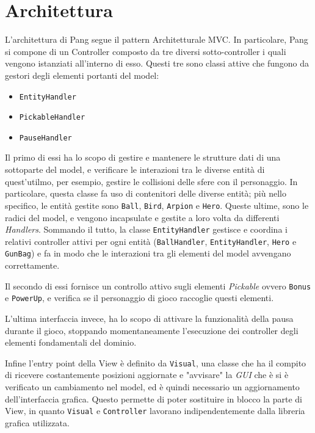 \documentclass[a4paper,12pt]{report}
\begin{document}
\section{Architettura}
L'architettura di Pang segue il pattern Architetturale MVC. In particolare, Pang si compone di un Controller composto da tre diversi sotto-controller i quali vengono istanziati all'interno di esso. Questi tre sono classi attive che fungono da gestori degli elementi portanti del model: 
\begin{itemize}
    \item \texttt{EntityHandler}
    \item \texttt{PickableHandler}
    \item \texttt{PauseHandler}
\end{itemize}
Il primo di essi ha lo scopo di gestire e mantenere le strutture dati di una sottoparte del model, e verificare le interazioni tra le diverse entità di quest'utilmo, per esempio, gestire le collisioni delle sfere con il personaggio. In particolare, questa classe fa uso di contenitori delle diverse entità; più nello specifico, le entità gestite sono \texttt{Ball}, \texttt{Bird}, \texttt{Arpion} e \texttt{Hero}. Queste ultime, sono le radici del model, e vengono incapsulate e gestite a loro volta da differenti \emph{Handlers}. Sommando il tutto, la classe \texttt{EntityHandler} gestisce e coordina i relativi controller attivi per ogni entità (\texttt{BallHandler}, \texttt{EntityHandler}, \texttt{Hero} e \texttt{GunBag}) e fa in modo che le interazioni tra gli elementi del model avvengano correttamente.

Il secondo di essi fornisce un controllo attivo sugli elementi \emph{Pickable} ovvero \texttt{Bonus} e \texttt{PowerUp}, e verifica se il personaggio di gioco raccoglie questi elementi.

L'ultima interfaccia invece, ha lo scopo di attivare la funzionalità della pausa durante il gioco, stoppando momentaneamente l'esecuzione dei controller degli elementi fondamentali del dominio.

Infine l'entry point della View è definito da \texttt{Visual}, una classe che ha il compito di ricevere costantemente posizioni aggiornate e "avvisare" la \emph{GUI} che è si è verificato un cambiamento nel model, ed è quindi necessario un aggiornamento dell'interfaccia grafica. Questo permette di poter sostituire in blocco la parte di View, in quanto \texttt{Visual} e \texttt{Controller} lavorano indipendentemente dalla libreria grafica utilizzata.
\end{document}
